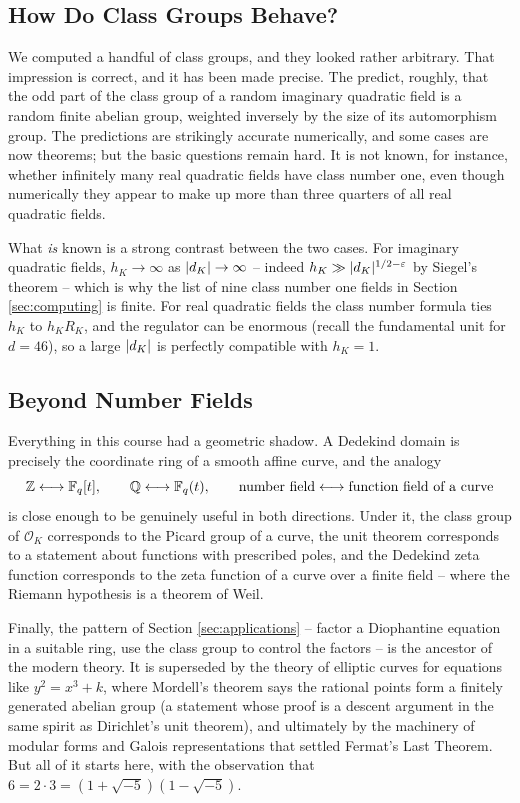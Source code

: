 \documentclass[a4paper]{scrartcl}
\renewcommand{\OO}{\mathcal{O}}
\begin{document}
\subsection{How Do Class Groups Behave?}

We computed a handful of class groups, and they looked rather arbitrary. That impression is correct, and it has been made precise. The  predict, roughly, that the odd part of the class group of a random imaginary quadratic field is a random finite abelian group, weighted inversely by the size of its automorphism group. The predictions are strikingly accurate numerically, and some cases are now theorems; but the basic questions remain hard. It is not known, for instance, whether infinitely many real quadratic fields have class number one, even though numerically they appear to make up more than three quarters of all real quadratic fields.

What \emph{is} known is a strong contrast between the two cases. For imaginary quadratic fields, $h_K \to \infty$ as $\lvert d_K\rvert\to\infty$ -- indeed $h_K \gg \lvert d_K\rvert^{1/2-\varepsilon}$ by Siegel's theorem -- which is why the list of nine class number one fields in Section \ref{sec:computing} is finite. For real quadratic fields the class number formula ties $h_K$ to $h_KR_K$, and the regulator can be enormous (recall the fundamental unit for $d = 46$), so a large $\lvert d_K\rvert$ is perfectly compatible with $h_K = 1$.

\subsection{Beyond Number Fields}

Everything in this course had a geometric shadow. A Dedekind domain is precisely the coordinate ring of a smooth affine curve, and the analogy
$$\mathbb{Z} \longleftrightarrow \mathbb{F}_q[t], \qquad \mathbb{Q} \longleftrightarrow \mathbb{F}_q(t), \qquad \text{number field} \longleftrightarrow \text{function field of a curve}$$
is close enough to be genuinely useful in both directions. Under it, the class group of $\OO_K$ corresponds to the Picard group of a curve, the unit theorem corresponds to a statement about functions with prescribed poles, and the Dedekind zeta function corresponds to the zeta function of a curve over a finite field -- where the Riemann hypothesis is a theorem of Weil.

Finally, the pattern of Section \ref{sec:applications} -- factor a Diophantine equation in a suitable ring, use the class group to control the factors -- is the ancestor of the modern theory. It is superseded by the theory of elliptic curves for equations like $y^2 = x^3+k$, where Mordell's theorem says the rational points form a finitely generated abelian group (a statement whose proof is a descent argument in the same spirit as Dirichlet's unit theorem), and ultimately by the machinery of modular forms and Galois representations that settled Fermat's Last Theorem. But all of it starts here, with the observation that $6 = 2\cdot3 = (1+\sqrt{-5})(1-\sqrt{-5})$.
\end{document}
